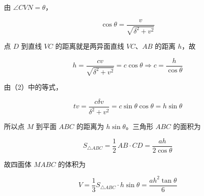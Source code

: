 \begin{answer}

由 $\angle CVN=\theta$，

\nopagebreak[4]
\[
\cos\theta=\frac{v}{\sqrt{\delta^2+v^2}}
\]

点 $D$ 到直线 $VC$ 的距离就是两异面直线 $VC$、$AB$ 的距离 $h$，故

\nopagebreak[4]
\[
h=\frac{cv}{\sqrt{\delta^2+v^2}}=c\cos\theta
\Longrightarrow
c=\frac{h}{\cos\theta}
\]

由（2）中的等式，

\nopagebreak[4]
\[
tv=\frac{c\delta v}{\delta^2+v^2}
=c\sin\theta\cos\theta
=h\sin\theta
\]

所以点 $M$ 到平面 $ABC$ 的距离为 $h\sin\theta$。三角形 $ABC$ 的面积为

\nopagebreak[4]
\[
S_{\triangle ABC}=\frac12\,AB\cdot CD
=\frac{ah}{2\cos\theta}
\]

故四面体 $MABC$ 的体积为

\nopagebreak[4]
\[
V=\frac13S_{\triangle ABC}\cdot h\sin\theta
=\frac{ah^2\tan\theta}{6}
\]




\end{answer}
